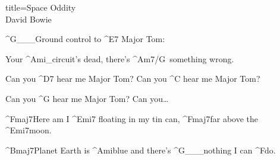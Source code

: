 \begin{song}{title=\predtitle\centering Space Oddity \\\large David Bowie  \vspace*{-0.3cm}}
\begin{centerjustified}
	^{G{\color{white}\_\_\_}}Ground control to ^{E7\,\,}Major Tom: 

	Your ^{Ami{\color{white}\_}}circuit's dead, there's ^{Am7/G\,\,\,}something wrong.

	Can you ^{D7\,\,}hear me Major Tom? Can you ^{C\,\,}hear me Major Tom? 

	Can you ^{G\,\,}hear me Major Tom? Can you\dots

	^{Fmaj7}Here am I ^{Emi7\,\,}floating in my tin can, ^{Fmaj7}far above the ^{Emi7}moon.

	^{Bmaj7}Planet Earth is ^{Ami}blue and there's ^{G{\color{white}\_\_\_}}nothing I can ^{F}do.


\end{centerjustified}
\setcounter{Slokočet}{0}
\end{song}
